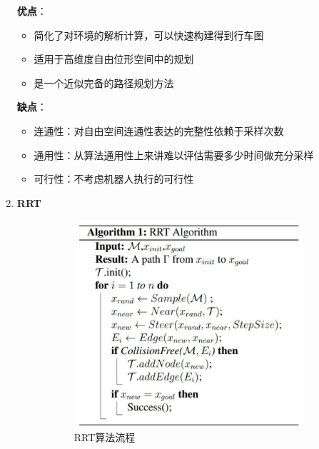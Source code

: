 \documentclass[../main.tex]{subfiles}
\begin{document}
\begin{enumerate}
        \textbf{优点}：
            \begin{itemize}
                \item 简化了对环境的解析计算，可以快速构建得到行车图
                \item 适用于高维度自由位形空间中的规划
                \item 是一个近似完备的路径规划方法
            \end{itemize}
        \textbf{缺点}：
            \begin{itemize}
                \item 连通性：对自由空间连通性表达的完整性依赖于采样次数
                \item 通用性：从算法通用性上来讲难以评估需要多少时间做充分采样
                \item 可行性：不考虑机器人执行的可行性
            \end{itemize}
    \item \textbf{RRT}\label{item:prob:rrt}
        \begin{figure}[H]
            \centering
            \begin{subfigure}[b]{0.45\textwidth}
                \centering
                \includegraphics[width=\linewidth]{images/rrt.png}
                \caption{RRT算法流程}
            \end{subfigure}
            \hfill
            \begin{subfigure}[b]{0.50\textwidth}

\end{subfigure}
\end{figure}
\end{enumerate}
\end{document}
